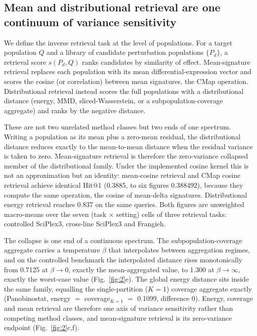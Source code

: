 \documentclass[11pt,letterpaper]{article}
\begin{document}
\subsection*{Mean and distributional retrieval are one continuum of variance sensitivity}

We define the inverse retrieval task at the level of populations. For a target
population $Q$ and a library of candidate perturbation populations $\{P_d\}$, a
retrieval score $s(P_d, Q)$ ranks candidates by similarity of effect. Mean-signature
retrieval replaces each population with its mean differential-expression vector and
scores the cosine (or correlation) between mean signatures, the CMap operation.
Distributional retrieval instead scores the full populations with a distributional distance (energy,
MMD, sliced-Wasserstein, or a subpopulation-coverage aggregate) and ranks by the
negative distance.

These are not two unrelated method classes but two ends of one spectrum. Writing a
population as its mean plus a zero-mean residual, the distributional distance
reduces exactly to the mean-to-mean distance when the residual variance is taken to
zero. Mean-signature retrieval is therefore the zero-variance collapsed member
of the distributional family. Under the implemented cosine kernel this is not an approximation
but an identity: mean-cosine retrieval and CMap cosine retrieval achieve identical Hit@1
(0.3885, to six figures 0.388492), because they compute the same operation, the cosine
of mean-delta signatures. Distributional energy retrieval reaches 0.837 on the same
queries. Both figures are unweighted macro-means over the seven (task $\times$ setting) cells of
three retrieval tasks: controlled SciPlex3, cross-line SciPlex3 and Frangieh.

The collapse is one end of a continuous spectrum. The subpopulation-coverage aggregate carries
a temperature $\beta$ that interpolates between aggregation regimes, and on the controlled
benchmark the interpolated distance rises monotonically from 0.7125 at $\beta \to 0$,
exactly the mean-aggregated value, to 1.300 at $\beta \to \infty$, exactly the worst-case
value (Fig.~\ref{fig:2}e). The global energy distance sits inside the same family, equalling the
single-partition ($K = 1$) coverage aggregate exactly (Panobinostat, energy $=$ coverage$_{K=1}$
$=$ 0.1099, difference 0). Energy, coverage and mean retrieval are therefore one axis of variance
sensitivity rather than competing method classes, and mean-signature retrieval is its
zero-variance endpoint (Fig.~\ref{fig:2}c,f).
\end{document}
